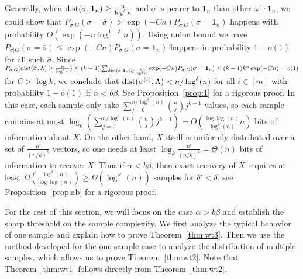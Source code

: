 \documentclass{article}
\begin{document}
Generally, when $\operatorname{dist}(\bar{\sigma}, \mathbf{1}_n) \geq \frac{n}{\log^{\delta} n}$ and $\bar{\sigma}$
is nearer to $\mathbf{1}_{n}$ than other $\omega^r \cdot \mathbf{1}_n$, we could show that
$P_{\sigma | G}(\sigma = \bar{\sigma} ) > \exp(-Cn) P_{\sigma | G}(\sigma = \mathbf{1}_n)$
happens with probability $O(\exp(-n \log^{1-\delta} n ))$. Using union bound we have
$P_{\sigma | G}(\sigma = \bar{\sigma} ) \leq \exp(-Cn) P_{\sigma | G}(\sigma = \mathbf{1}_n)$
happens in probability $1-o(1)$ for all such $\bar{\sigma}$.
Since $P_{\sigma | G}(\operatorname{dist}(\bar{\sigma}, \Lambda)\geq \frac{n}{\log^{\delta} n}) \leq
(k-1)\sum_{\operatorname{dist}(\bar{\sigma}, \mathbf{1}_n) \geq \frac{n}{\log^{\delta} n}}\exp(-Cn) P_{\sigma | G}(\sigma = \mathbf{1}_n)
\leq (k-1)k^n \exp(-Cn) = o(1)$ for $C> \log k$, we conclude that
$\operatorname{dist}(\sigma^{(i)}, \Lambda)< n/\log^{\delta}(n)$ for all $i\in[m]$ with probability $1-o(1)$ if $\alpha<b\beta$. See Proposition~\ref{prop:1} for a rigorous proof.
In this case, each sample only take $\sum_{j=0}^{n/\log^{\delta}(n)}\binom{n}{j}j^{k-1}$ values, so each sample contains at most $\log_k(\sum_{j=0}^{n/\log^{\delta}(n)}\binom{n}{j}j^{k-1})=O(\frac{\log\log(n)}{\log^{\delta}(n)} n)$ bits of information about $X$. On the other hand, $X$ itself is uniformly distributed over a set of $\frac{n!}{(n/k)^k}$ vectors, so one needs at least $\log_k\frac{n!}{(n/k)^k}=\Theta(n)$ bits of information to recover $X$. Thus if $\alpha<b\beta$, then exact recovery of $X$ requires at least $\Omega(\frac{\log^{\delta}(n)}{\log\log(n)})\ge \Omega(\log^{\delta'}(n))$ samples for $\delta'<\delta$. see Proposition~\ref{prop:ab} for a rigorous proof.


For the rest of this section, we will focus on the case $\alpha>b\beta$ and establish the sharp threshold on the sample complexity. We first analyze the typical behavior of one sample and explain how to prove Theorem~\ref{thm:wt3}. Then we use the method developed for the one sample case to analyze the distribution of multiple samples, which allows us to prove Theorem~\ref{thm:wt2}. Note that Theorem~\ref{thm:wt1} follows directly from Theorem~\ref{thm:wt2}.
\end{document}
